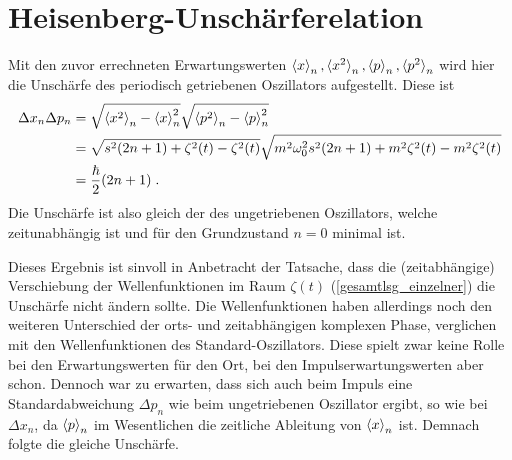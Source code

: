   \section{Heisenberg-Unschärferelation}
    Mit den zuvor errechneten Erwartungswerten $\braket{x}_n,\braket{x^2}_n,\braket{p}_n,\braket{p^2}_n$ wird hier die Unschärfe des periodisch getriebenen Oszillators aufgestellt.
    Diese ist
    \begin{align}
      \Delta x_n\Delta p_n &= \sqrt{\braket{x^2}_n-\braket{x}^2_n}\sqrt{\braket{p^2}_n-\braket{p}^2_n} \notag\\
      &= \sqrt{s^2(2n+1)+\zeta^2(t)-\zeta^2(t)}\sqrt{m^2\omega^2_0s^2(2n+1)+m^2\zeta^2(t)-m^2\zeta^2(t)} \notag\\
      &= \frac{\hbar}{2}(2n+1) \; .
    \end{align}
    Die Unschärfe ist also gleich der des ungetriebenen Oszillators, welche zeitunabhängig ist und für den Grundzustand $n=0$ minimal ist.

    Dieses Ergebnis ist sinvoll in Anbetracht der Tatsache, dass die (zeitabhängige) Verschiebung der Wellenfunktionen im Raum $\zeta(t)$ (\ref{gesamtlsg_einzelner}) die Unschärfe nicht ändern sollte.
    Die Wellenfunktionen haben allerdings noch den weiteren Unterschied der orts- und zeitabhängigen komplexen Phase, verglichen mit den Wellenfunktionen des Standard-Oszillators.
    Diese spielt zwar keine  Rolle bei den Erwartungswerten für den Ort, bei den Impulserwartungswerten aber schon.
    Dennoch war zu erwarten, dass sich auch beim Impuls eine Standardabweichung $\Delta p_n$ wie beim ungetriebenen Oszillator ergibt, so wie bei $\Delta x_n$, da $\braket{p}_n$ im Wesentlichen die zeitliche Ableitung von $\braket{x}_n$ ist.
    Demnach folgte die gleiche Unschärfe.


\iffalse
  \subsection{Erwartungswerte der Energie}
    Hier werden wir den normalen zeitabhängigen Erwartungswert der Energie $\braket{H(t)}_n$ aufstellen.
    Weiterhin wird der zeitlich, über eine Periode $T$, gemittelten Erwartungswert $\bar H_n$ mittels Formel (\ref{mittleres_H}) für eine beliebige Treibkraft bestimmt, indem wir die Quasienergien $\epsilon_n$ benutzen, welche wir in Kapitel \ref{espsilon_bel_kraft} für eine allgemeine periodische Treibkraft $S(t)$, in Abhängigkeit deren  Fourier-Koeffizienten, bestimmt haben.
\fi

